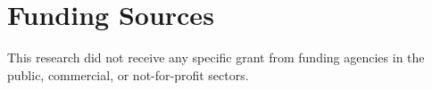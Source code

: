 \section*{Funding Sources}
This research did not receive any specific grant from funding agencies in the public, commercial, or not-for-profit sectors.
